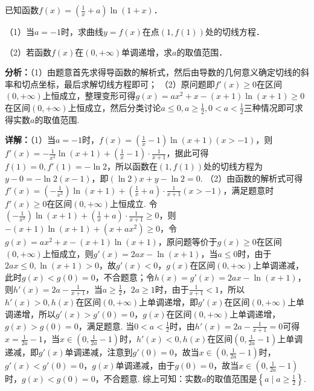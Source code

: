 \begin{question}[points=12]
已知函数$f(x)=\left(\frac{1}{x}+a\right)\ln(1+x)$．

（1）当$a=-1$时，求曲线$y=f(x)$在点$(1,f(1))$处的切线方程．

（2）若函数$f(x)$在$(0,+\infty)$单调递增，求$a$的取值范围．
\begin{solution}

\textbf{分析：}（1）由题意首先求得导函数的解析式，然后由导数的几何意义确定切线的斜率和切点坐标，最后求解切线方程即可；
（2）原问题即$f'(x)\ge0$在区间$(0,+\infty)$上恒成立，整理变形可得$g(x)=ax^2+x-(x+1)\ln(x+1)\ge0$在区间$(0,+\infty)$上恒成立，然后分类讨论$a\le0, a\ge\frac{1}{2}, 0<a<\frac{1}{2}$三种情况即可求得实数$a$的取值范围.

\textbf{详解：}（1）当$a=-1$时，$f(x)=\left(\frac{1}{x}-1\right)\ln(x+1)(x>-1)$，则$f'(x)=-\frac{1}{x^2}\ln(x+1)+\left(\frac{1}{x}-1\right)\cdot\frac{1}{x+1}$，据此可得$f(1)=0, f'(1)=-\ln2$，所以函数在$(1,f(1))$处的切线方程为$y-0=-\ln2(x-1)$，即$(\ln2)x+y-\ln2=0$.
（2）由函数的解析式可得$f'(x)=\left(-\frac{1}{x^2}\right)\ln(x+1)+\left(\frac{1}{x}+a\right)\cdot\frac{1}{x+1}(x>-1)$，满足题意时$f'(x)\ge0$在区间$(0,+\infty)$上恒成立. 令$\left(-\frac{1}{x^2}\right)\ln(x+1)+\left(\frac{1}{x}+a\right)\cdot\frac{1}{x+1}\ge0$，则$-(x+1)\ln(x+1)+(x+ax^2)\ge0$，令$g(x)=ax^2+x-(x+1)\ln(x+1)$，原问题等价于$g(x)\ge0$在区间$(0,+\infty)$上恒成立，则$g'(x)=2ax-\ln(x+1)$，当$a\le0$时，由于$2ax\le0, \ln(x+1)>0$，故$g'(x)<0$，$g(x)$在区间$(0,+\infty)$上单调递减，此时$g(x)<g(0)=0$，不合题意；令$h(x)=g'(x)=2ax-\ln(x+1)$，则$h'(x)=2a-\frac{1}{x+1}$，当$a\ge\frac{1}{2}$，$2a\ge1$时，由于$\frac{1}{x+1}<1$，所以$h'(x)>0, h(x)$在区间$(0,+\infty)$上单调递增，即$g'(x)$在区间$(0,+\infty)$上单调递增，所以$g'(x)>g'(0)=0$，$g(x)$在区间$(0,+\infty)$上单调递增，$g(x)>g(0)=0$，满足题意. 当$0<a<\frac{1}{2}$时，由$h'(x)=2a-\frac{1}{x+1}=0$可得$x=\frac{1}{2a}-1$，当$x\in(0,\frac{1}{2a}-1)$时，$h'(x)<0, h(x)$在区间$(0,\frac{1}{2a}-1)$上单调递减，即$g'(x)$单调递减，注意到$g'(0)=0$，故当$x\in(0,\frac{1}{2a}-1)$时，$g'(x)<g'(0)=0$，$g(x)$单调递减，由于$g(0)=0$，故当$x\in(0,\frac{1}{2a}-1)$时，$g(x)<g(0)=0$，不合题意. 综上可知：实数$a$的取值范围是$\left\{a\mid a\ge\frac{1}{2}\right\}$.
\end{solution}
\end{question}

